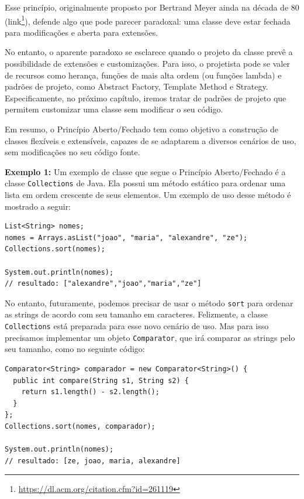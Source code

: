 \documentclass[
  11pt,
  twoside]{book}
\newcommand{\passthrough}[1]{#1}
\DeclareRobustCommand{\href}[2]{#2\footnote{\url{#1}}}
\begin{document}
 

Esse princípio, originalmente proposto por Bertrand Meyer ainda na
década de 80 (\href{https://dl.acm.org/citation.cfm?id=261119}{link}),
defende algo que pode parecer paradoxal: uma classe deve estar fechada
para modificações e aberta para extensões.

No entanto, o aparente paradoxo se esclarece quando o projeto da classe
prevê a possibilidade de extensões e customizações. Para isso, o
projetista pode se valer de recursos como herança, funções de mais alta
ordem (ou funções lambda) e padrões de projeto, como Abstract Factory,
Template Method e Strategy. Especificamente, no próximo capítulo, iremos
tratar de padrões de projeto que permitem customizar uma classe sem
modificar o seu código.

Em resumo, o Princípio Aberto/Fechado tem como objetivo a construção de
classes flexíveis e extensíveis, capazes de se adaptarem a diversos
cenários de uso, sem modificações no seu código fonte.

\textbf{Exemplo 1:} Um exemplo de classe que segue o Princípio
Aberto/Fechado é a classe \passthrough{\lstinline!Collections!} de Java.
Ela possui um método estático para ordenar uma lista em ordem crescente
de seus elementos. Um exemplo de uso desse método é mostrado a seguir:

\begin{lstlisting}
List<String> nomes;
nomes = Arrays.asList("joao", "maria", "alexandre", "ze");
Collections.sort(nomes);

System.out.println(nomes);  
// resultado: ["alexandre","joao","maria","ze"]
\end{lstlisting}

No entanto, futuramente, podemos precisar de usar o método
\passthrough{\lstinline!sort!} para ordenar as strings de acordo com seu
tamanho em caracteres. Felizmente, a classe
\passthrough{\lstinline!Collections!} está preparada para esse novo
cenário de uso. Mas para isso precisamos implementar um objeto
\passthrough{\lstinline!Comparator!}, que irá comparar as strings pelo
seu tamanho, como no seguinte código:

\begin{lstlisting}
Comparator<String> comparador = new Comparator<String>() {
  public int compare(String s1, String s2) {
    return s1.length() - s2.length();
  }
};
Collections.sort(nomes, comparador);

System.out.println(nomes);   
// resultado: [ze, joao, maria, alexandre]
\end{lstlisting}
\end{document}
